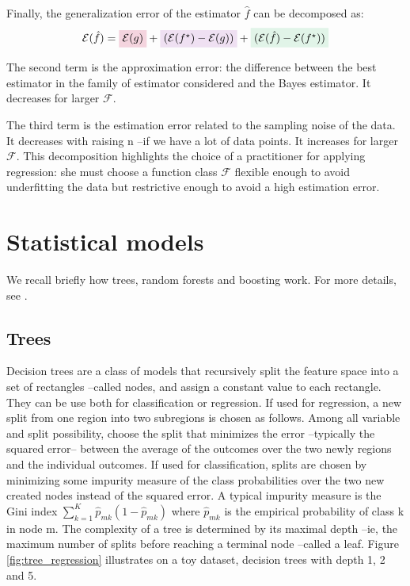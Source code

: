 \documentclass[french,12pt,twoside,a4paper]{book}
\newcommand{\highlight}[2]{\colorbox{#1!17}{$\displaystyle #2$}}
\renewcommand{\highlight}[2]{\colorbox{#1!17}{#2}}
\begin{document}
\begin{appendices}
  Finally, the generalization error of the estimator $\hat f$ can be decomposed as:
  \begin{equation}
    \mathcal{E}(\hat f) = \highlight{bayes_error}{\color{black} $\mathcal{E}(g)$} +
    \highlight{approximation_error}{$(\mathcal{E}(f^{\star}) - \mathcal{E}(g))$} +
    \highlight{estimation_error}{$(\mathcal{E}(\hat{f}) - \mathcal{E}(f^{\star}))$}
  \end{equation}


  The \highlight{approximation_error}{second term} is the approximation error: the difference between the best
  estimator in the family of estimator considered and the Bayes estimator. It
  decreases for larger $\mathcal{F}$.

  The \highlight{estimation_error}{third term} is the estimation error related to the
  sampling noise of the data. It decreases with raising n --if we have a lot of
  data points. It increases for larger $\mathcal{F}$. This decomposition
  highlights the choice of a practitioner for applying regression: she must
  choose a function class $\mathcal{F}$ flexible enough to avoid underfitting
  the data but restrictive enough to avoid a high estimation error.

  \section{Statistical models}\label{apd:intro:statistical_models}

  We recall briefly how trees, random forests and boosting work. For more
  details, see \citep{hastie2009elements}.

  \subsection{Trees}\label{apd:intro:trees}

  Decision trees are a class of models that recursively split the feature space
  into a set of rectangles --called nodes, and assign a constant value to each
  rectangle. They can be use both for classification or regression. If used for
  regression, a new split from one region into two subregions is chosen as
  follows. Among all variable and split possibility, choose the split that
  minimizes the error --typically the squared error-- between the average of the
  outcomes over the two newly regions and the individual outcomes. If used for
  classification, splits are chosen by minimizing some impurity measure of the
  class probabilities over the two new created nodes instead of the squared
  error. A typical impurity measure is the Gini index $\sum_{k=1}^K \hat p_{mk}
    (1-\hat p_{mk})$ where $\hat p_{mk}$ is the empirical probability of class k
  in node m. The complexity of a tree is determined by its maximal depth --ie,
  the maximum number of splits before reaching a terminal node --called a leaf.
  Figure \ref{fig:tree_regression} illustrates on a toy dataset, decision trees
  with depth 1, 2 and 5.


\end{appendices}
\end{document}
